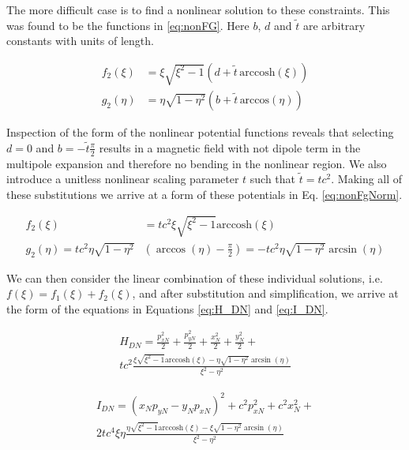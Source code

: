 The more difficult case is to find a nonlinear solution to these constraints. This was found to be the functions in \ref{eq:nonFG}. Here $b$, $d$ and $\tilde{t}$ are arbitrary constants with units of length.

\begin{equation} \label{eq:nonFG}
\begin{split}
	f_2(\xi) &= \xi \sqrt{\xi^2 -1}(d + \tilde{t} \hspace{2pt} \textrm{arccosh}(\xi)) \\
	g_2(\eta) &= \eta \sqrt{1-\eta^2}(b + \tilde{t} \hspace{2pt} \textrm{arccos}(\eta))
\end{split}
\end{equation}

Inspection of the form of the nonlinear potential functions reveals that selecting $d=0$ and $b=-\tilde{t}\frac{\pi}{2}$ results in a magnetic field with not dipole term in the multipole expansion and therefore no bending in the nonlinear region. We also introduce a unitless nonlinear scaling parameter $t$ such that $\tilde{t} = tc^2$. Making all of these substitutions we arrive at a form of these potentials in Eq. \ref{eq:nonFgNorm}.

\begin{equation} \label{eq:nonFgNorm}
\begin{split}
	f_2(\xi) &= t c^2 \xi \sqrt{\xi^2 -1} \textrm{arccosh}(\xi) \\
	g_2(\eta) = t c^2 \eta \sqrt{1-\eta^2}&\left(\arccos{(\eta) - \frac{\pi}{2}}\right) = -t c^2 \eta \sqrt{1-\eta^2}\arcsin{(\eta)}
\end{split}
\end{equation}

We can then consider the linear combination of these individual solutions, i.e. $f(\xi) = f_1(\xi)+f_2(\xi)$, and after substitution and simplification, we arrive at the form of the equations in Equations \ref{eq:H_DN} and \ref{eq:I_DN}.

\begin{multline} \label{eq:H_DN}
	H_{DN} = \frac{p_{xN}^2}{2} + \frac{p_{yN}^2}{2}  + \frac{x_{N}^2}{2} + \frac{y_{N}^2}{2} +\\
	tc^2 \frac{\xi \sqrt{\xi^2 -1} \textrm{arccosh}(\xi) - \eta \sqrt{1-\eta^2}\arcsin{(\eta)}}{\xi^2 - \eta^2} 
\end{multline}

\begin{multline} \label{eq:I_DN}
	I_{DN} = (x_N p_{yN} - y_N p_{xN})^2 + c^2 p_{xN}^2 + c^2 x_N^2 +\\ 
	2t c^4 \xi \eta \frac{\eta\sqrt{\xi^2 -1} \textrm{arccosh}(\xi) - \xi \sqrt{1-\eta^2}\arcsin{(\eta)}}{\xi^2 - \eta^2}
\end{multline}

